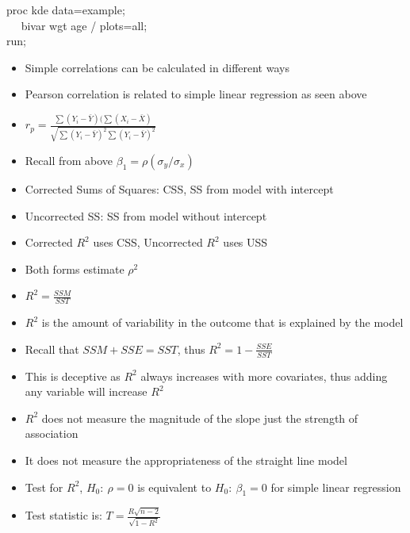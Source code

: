 \documentclass[handout,x11names,unknownkeysallowed]{beamer}
\makeatletter
\newcommand{\beamitem}{\begin{itemize}[<+-|alert@+>]}
\makeatother
\begin{document}
\begin{frame}

proc kde data=example; \\
~~	bivar wgt age / plots=all;\\
run;

\end{frame}



\begin{frame}
\beamitem
\item Simple correlations can be calculated in different ways
\item Pearson correlation is related to simple linear regression as seen above
\item $r_p = \frac{\sum(Y_i-\bar{Y})(\sum(X_{i}-\bar{X})}{\sqrt{\sum(Y_i-\bar{Y})^2 \sum(Y_i-\bar{Y})^2}}$
\item Recall from above $\beta_1 = \rho(\sigma_y/\sigma_x)$
\end{itemize}
\end{frame}

\begin{frame}
\beamitem
\item Corrected Sums of Squares: CSS, SS from model with intercept
\item Uncorrected SS: SS from model without intercept
\item Corrected $R^2$ uses CSS, Uncorrected $R^2$ uses USS
\item Both forms estimate $\rho^2$
\item $R^2 = \frac{SSM}{SST}$
\end{itemize}
\end{frame}

\begin{frame}
\beamitem
\item $R^2$ is the amount of variability in the outcome that is explained by the model
\item Recall that $SSM + SSE = SST$, thus $R^2= 1 - \frac{SSE}{SST}$
\item This is deceptive as $R^2$ always increases with more covariates, thus adding any variable will increase $R^2$
\end{itemize}
\end{frame}


\begin{frame}

\beamitem
\item $R^2$ does not measure the magnitude of the slope just the strength of association
\item It does not measure the appropriateness of the straight line model
\item Test for $R^2$, $H_0:~\rho=0$ is equivalent to $H_0:~\beta_1=0$ for simple linear regression
\item Test statistic is: $T = \frac{R\sqrt{n-2}}{\sqrt{1-R^2}}$
\end{itemize}
\end{frame}
\end{document}
